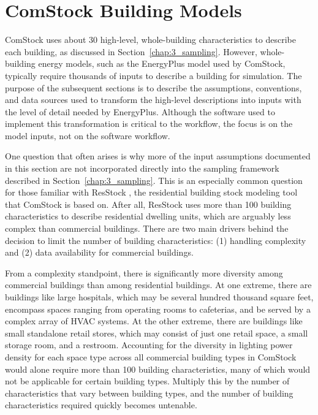 \chapter{ComStock Building Models}
\label{chap:4_modeling}

ComStock uses about 30 high-level, whole-building characteristics to describe each building, as discussed in Section~\ref{chap:3_sampling}. However, whole-building energy models, such as the EnergyPlus\textsuperscript{\textregistered} model used by ComStock, typically require thousands of  inputs to describe a building for simulation. The purpose of the subsequent sections is to describe the assumptions, conventions, and data sources used to transform the high-level descriptions into inputs with the level of detail needed by EnergyPlus. Although the software used to implement this transformation is critical to the workflow, the focus is on the model inputs, not on the software workflow.

One question that often arises is why more of the input assumptions documented in this section are not incorporated directly into the sampling framework described in Section~\ref{chap:3_sampling}. This is an especially common question for those familiar with ResStock\textsuperscript{\texttrademark} \citep{resstock}, the residential building stock modeling tool that ComStock is based on. After all, ResStock uses more than 100 building characteristics to describe residential dwelling units, which are arguably less complex than commercial buildings. There are two main drivers behind the decision to limit the number of building characteristics: (1) handling complexity and (2) data availability for commercial buildings.

From a complexity standpoint, there is significantly more diversity among commercial buildings than among residential buildings. At one extreme, there are buildings like large hospitals, which may be several hundred thousand square feet, encompass spaces ranging from operating rooms to cafeterias, and be served by a complex array of HVAC systems. At the other extreme, there are buildings like small standalone retail stores, which may consist of just one retail space, a small storage room, and a restroom. Accounting for the diversity in lighting power density for each space type across all commercial building types in ComStock would alone require more than 100 building characteristics, many of which would not be applicable for certain building types. Multiply this by the number of characteristics that vary between building types, and the number of building characteristics required quickly becomes untenable.

